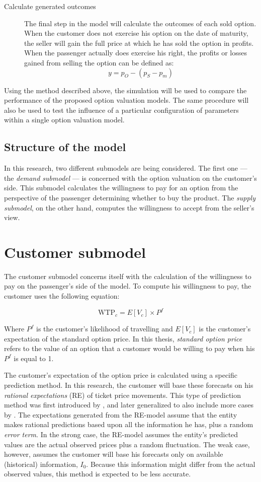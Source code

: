 \begin{description}

\item[Calculate generated outcomes] The final step in the model will calculate the outcomes of each sold option. When the customer does not exercise his option on the date of maturity, the seller will gain the full price at which he has sold the option in profits. When the passenger actually does exercise his right, the profits or losses gained from selling the option can be defined as:
$$ y = p_O - (p_S - p_m) $$
\end{description}

Using the method described above, the simulation will be used to compare the performance of the proposed option valuation models. The same procedure will also be used to test the influence of a particular configuration of parameters within a single option valuation model.


\subsection{Structure of the model}
In this research, two different submodels are being considered. The first one --- the \emph{demand submodel} --- is concerned with the option valuation on the customer's side. This submodel calculates the willingness to pay for an option from the perspective of the passenger determining whether to buy the product. The \emph{supply submodel}, on the other hand, computes the willingness to accept from the seller's view.

\section{Customer submodel}
The customer submodel concerns itself with the calculation of the willingness to pay on the passenger's side of the model. To compute his willingness to pay, the customer uses the following equation:

$$ \mbox{WTP}_c = E[V_c] \times P^f $$

Where $P^f$ is the customer's likelihood of travelling and $E[V_c]$ is the customer's expectation of the standard option price. In this thesis, \emph{standard option price} refers to the value of an option that a customer would be willing to pay when his $P^f$ is equal to 1.

The customer's expectation of the option price is calculated using a specific prediction method. In this research, the customer will base these forecasts on his \emph{rational expectations} (RE) of ticket price movements. This type of prediction method was first introduced by , and later generalized to also include more cases by . The expectations generated from the RE-model assume that the entity makes rational predictions based upon all the information he has, plus a random \emph{error term}. In the strong case, the RE-model assumes the entity's predicted values are the actual observed prices plus a random fluctuation. The weak case, however, assumes the customer will base his forecasts only on available (historical) information, $I_0$. Because this information might differ from the actual observed values, this method is expected to be less accurate.

